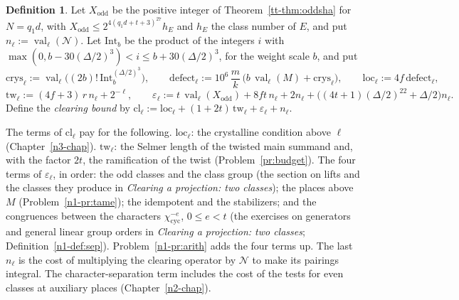 \documentclass[reqno]{amsart}
\newcounter{chap}
\theoremstyle{definition}
\newtheorem{definition}{Definition}[section]
\theoremstyle{plain}
\newcommand{\cyc}{\chi_{\mathrm{cyc}}}
\newcommand{\val}{\operatorname{val}}
\newcommand{\cl}{\mathrm{cl}}
\newcommand{\loc}{\mathrm{loc}}
\begin{document}
\begin{definition}\label{def:clearing-bound}
Let \(X_{\mathrm{odd}}\) be the positive integer of Theorem~\ref{tt-thm:oddsha} for \(N = q_1d\), with \(X_{\mathrm{odd}} \le 2^{4(q_1d + t + 3)^{27}} h_E\) and \(h_E\) the class number of \(E\), and put \(n_\ell := \val_\ell(\mathcal N)\).  Let \(\mathrm{Int}_b\) be the product of the integers \(i\) with \(\max(0, b - 30(\Delta/2)^3) < i \le b + 30(\Delta/2)^3\), for the weight scale \(b\), and put
\[
  \mathrm{crys}_\ell := \val_\ell\bigl((2b)!\,\mathrm{Int}_b^{(\Delta/2)^3}\bigr), \qquad \mathrm{defect}_\ell := 10^6\,\frac mk\,\bigl(b\,\val_\ell(M) + \mathrm{crys}_\ell\bigr), \qquad \loc_\ell := 4f\,\mathrm{defect}_\ell ,
\]
\[
  \mathrm{tw}_\ell := (4f + 3)\,r\,n_\ell + 2^{-\ell}, \qquad \varepsilon_\ell := t\,\val_\ell(X_{\mathrm{odd}}) + 8ft\,n_\ell + 2n_\ell + \bigl((4t + 1)(\Delta/2)^{22} + \Delta/2\bigr)n_\ell .
\]
Define the \emph{clearing bound} by \(\cl_\ell := \loc_\ell + (1 + 2t)\,\mathrm{tw}_\ell + \varepsilon_\ell + n_\ell\).
\end{definition}

The terms of \(\cl_\ell\) pay for the following.  \(\loc_\ell\): the crystalline condition above \(\ell\) (Chapter~\ref{n3-chap}).  \(\mathrm{tw}_\ell\): the Selmer length of the twisted main summand and, with the factor \(2t\), the ramification of the twist (Problem~\ref{pr:budget}).  The four terms of \(\varepsilon_\ell\), in order: the odd classes and the class group (the section on lifts and the classes they produce in \emph{Clearing a projection: two classes}); the places above \(M\) (Problem~\ref{n1-pr:tame}); the idempotent and the stabilizers; and the congruences between the characters \(\cyc^{-e}\), \(0 \le e < t\) (the exercises on generators and general linear group orders in \emph{Clearing a projection: two classes}; Definition~\ref{n1-def:sep}).  Problem~\ref{n1-pr:arith} adds the four terms up.  The last \(n_\ell\) is the cost of multiplying the clearing operator by \(\mathcal N\) to make its pairings integral.  The character-separation term includes the cost of the tests for even classes at auxiliary places (Chapter~\ref{n2-chap}).
\end{document}
